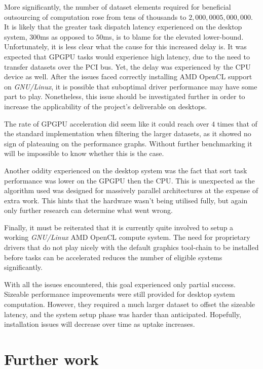 More significantly, the number of dataset elements required for beneficial outsourcing of computation rose from tens of thousands to $2,000,000$\textendash$5,000,000$. It is likely that the greater task dispatch latency experienced on the desktop system, $300$ms as opposed to $50$ms, is to blame for the elevated lower-bound. Unfortunately, it is less clear what the cause for this increased delay is. It was expected that \ac{GPGPU} tasks would experience high latency, due to the need to transfer datasets over the \ac{PCI} bus. Yet, the delay was experienced by the \ac{CPU} device as well. After the issues faced correctly installing \ac{AMD} \ac{OpenCL} support on \emph{GNU/Linux}, it is possible that suboptimal driver performance may have some part to play. Nonetheless, this issue should be investigated further in order to increase the applicability of the project's deliverable on desktops.

The rate of \ac{GPGPU} acceleration did seem like it could reach over $4$ times that of the standard implementation when filtering the larger datasets, as it showed no sign of plateauing on the performance graphs. Without further benchmarking it will be impossible to know whether this is the case.

Another oddity experienced on the desktop system was the fact that sort task performance was lower on the \ac{GPGPU} then the \ac{CPU}. This is unexpected as the algorithm used was designed for massively parallel architectures at the expense of extra work. This hints that the hardware wasn't being utilised fully, but again only further research can determine what went wrong.

Finally, it must be reiterated that it is currently quite involved to setup a working \emph{GNU/Linux} \ac{AMD} \ac{OpenCL} compute system. The need for proprietary drivers that do not play nicely with the default graphics tool-chain to be installed before tasks can be accelerated reduces the number of eligible systems significantly.

With all the issues encountered, this goal experienced only partial success. Sizeable performance improvements were still provided for desktop system computation. However, they required a much larger dataset to offset the sizeable latency, and the system setup phase was harder than anticipated. Hopefully, installation issues will decrease over time as uptake increases.

\section{Further work}
